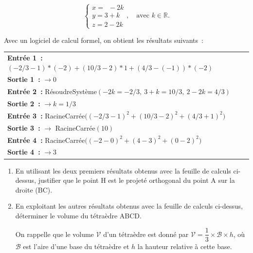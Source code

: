 \documentclass[10pt]{article}
\providecommand{\R}{\mathbb{R}}
\begin{document}
\begin{enumerate}
\[
\begin{cases}
x = \phantom{3}-2k\\
y = 3+k\\
z = 2-2k
\end{cases}, \quad \text{avec } k \in \R.
\]

Avec un logiciel de calcul formel, on obtient les résultats suivants~:

\begin{center}
\begin{tabular}{|p{8.5cm}|}\hline
\textbf{Entrée 1~:} $(-2/3-1)*(-2)+(10/3-2)*1+(4/3-(-1))*(-2)$\\
\textbf{Sortie 1~:} $\rightarrow 0$\\
\hline
\textbf{Entrée 2~:} RésoudreSystème$(-2k=-2/3,\ 3+k=10/3,\ 2-2k=4/3)$\\
\textbf{Sortie 2~:} $\rightarrow k = 1/3$\\
\hline
\textbf{Entrée 3~:} RacineCarrée$\big((-2/3-1)^2+(10/3-2)^2+(4/3+1)^2\big)$\\
\textbf{Sortie 3~:} $\rightarrow$ RacineCarrée$(10)$\\
\hline
\textbf{Entrée 4~:} RacineCarrée$\big((-2-0)^2+(4-3)^2+(0-2)^2\big)$\\
\textbf{Sortie 4~:} $\rightarrow 3$\\
\hline
\end{tabular}
\end{center}

	\begin{enumerate}[label=\textbf{\alph*.}]
		\item En utilisant les deux premiers résultats obtenus avec la feuille de calculs ci-dessus, justifier que le point H est le projeté orthogonal du point A sur la droite (BC).
		\item En exploitant les autres résultats obtenus avec la feuille de calculs ci-dessus, déterminer le volume du tétraèdre ABCD.

On rappelle que le volume $\mathcal{V}$ d'un tétraèdre est donné par $\mathcal{V} = \dfrac{1}{3}\times\mathcal{B}\times h$, où $\mathcal{B}$ est l'aire d'une base du tétraèdre et $h$ la hauteur relative à cette base.
	\end{enumerate}
\end{enumerate}
\end{document}
